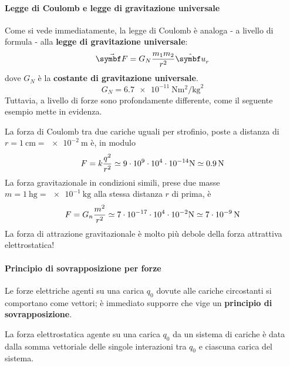 \paragraph{Legge di Coulomb e legge di gravitazione universale}
Come si vede immediatamente, la legge di Coulomb è analoga - a livello di formula - alla \textbf{legge di gravitazione universale}:
\begin{equation}
	\vba{F}=G_N\frac{m_1m_2}{r^2}\vbh{u}_r
\end{equation}
dove $G_N$ è la \textbf{costante di gravitazione universale}.
\begin{equation}
	G_N=\SI[per-mode = fraction,exponent-product=\ensuremath{\cdot}]{6,7e-11}{\newton\square\meter\per\square\kilogram}
\end{equation}
Tuttavia, a livello di forze sono profondamente differente, come il seguente esempio mette in evidenza.
\begin{example}
	La forza di Coulomb tra due cariche uguali per strofinio, poste a distanza di $r=\SI{1}{\centi\metre}=\SI{e-2}{\metre}$ è, in modulo
	\begin{equation*}
		F=k\frac{q^2}{r^2}\simeq\numproduct[product-symbol = \ensuremath{\cdot}]{9 x e9 x e4 x e-14}\unit{\newton}\simeq \SI[exponent-product=\ensuremath{\cdot}]{0,9}{\newton} 
	\end{equation*}
	La forza gravitazionale in condizioni simili, prese due masse $m=\SI{1}{\hecto\gram}=\SI{e-1}{\kilogram}$ alla stessa distanza $r$ di prima, è
	\begin{equation*}
		F=G_n\frac{m^2}{r^2}\simeq \numproduct[product-symbol = \ensuremath{\cdot}]{7 x e-17 x e4 x e-2}\unit{\newton}\simeq \SI[exponent-product=\ensuremath{\cdot}]{7e-9}{\newton}
	\end{equation*}
La forza di attrazione gravitazionale è molto più debole della forza attrattiva elettrostatica!
\end{example}
\paragraph{Principio di sovrapposizione per forze}
Le forze elettriche agenti su una carica $q_0$ dovute alle cariche circostanti si comportano come vettori; è immediato supporre che vige un \textbf{principio di sovrapposizione}.
\begin{principle}
	La forza elettrostatica agente su una carica $q_0$ da un sistema di cariche è data dalla somma vettoriale delle singole interazioni tra $q_0$ e ciascuna carica del sistema.
\end{principle}
